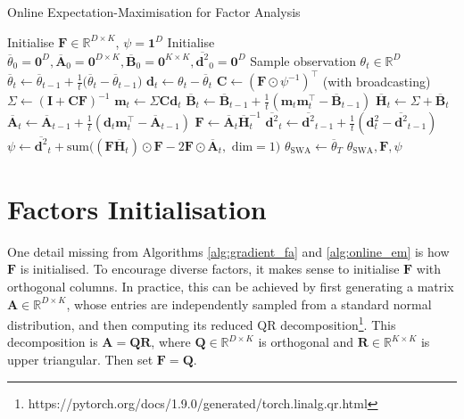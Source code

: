 \documentclass[msc,deptreport.inf]{infthesis} %
\newcommand{\matr}[1]{\mathbf{#1}}
\newcommand{\R}{\mathbb R}
\begin{document}
\begin{algorithm}[!htbp] 
	\caption{Online Expectation-Maximisation for Factor Analysis}
	\label{alg:online_em}
	\begin{algorithmic}[1]
		\State Initialise $\matr{F} \in \R^{D \times K}$, $\psi = \matr{1}^D$
		\State Initialise $\overline{\theta}_0 = \matr{0}^D, \overline{\matr{A}}_0 = \matr{0}^{D \times K}, 
			\overline{\matr{B}}_0 = \matr{0}^{K \times K}, \overline{\matr{d}^2}_0 = \matr{0}^D$
			\State Sample observation $\theta_t \in \R^D$
			\State
				$\overline{\theta}_t \leftarrow  \overline{\theta}_{t-1} + \frac{1}{t}\big(\overline{\theta}_t - \overline{\theta}_{t-1}\big)$
			\State $\matr{d}_t \leftarrow \theta_t - \overline{\theta}_t$
			\State $\matr{C} \leftarrow (\matr{F} \odot \psi^{-1})^\intercal$ (with broadcasting)
			\State $\Sigma \leftarrow (\matr{I} + \matr{C} \matr{F})^{-1}$ 
			\State $\matr{m}_t \leftarrow \Sigma \matr{C} \matr{d}_t$ 
			\State $\overline{\matr{B}}_t \leftarrow \overline{\matr{B}}_{t-1} + \frac{1}{t} (\matr{m}_t \matr{m}_t^\intercal - \overline{\matr{B}}_{t-1})$
			\State $\overline{\matr{H}}_t \leftarrow \Sigma + \overline{\matr{B}}_t$
			\State $\overline{\matr{A}}_t \leftarrow \overline{\matr{A}}_{t-1} + \frac{1}{t} (\matr{d}_t \matr{m}_t^\intercal - \overline{\matr{A}}_{t-1})$
			\State $\matr{F} \leftarrow \overline{\matr{A}}_t \overline{\matr{H}}_t^{-1}$
			\State $\overline{\matr{d}^2}_t \leftarrow \overline{\matr{d}^2}_{t-1} + \frac{1}{t} (\matr{d}_t^2 - \overline{\matr{d}^2}_{t-1})$
			\State $\psi \leftarrow 
				\overline{\matr{d}^2}_t
	+ \text{sum} \big((\matr{F} \overline{\matr{H}}_t) \odot \matr{F} -2\matr{F} \odot \overline{\matr{A}}_t , \text{ dim} = 1\big)$
		\EndFor
		\State $\theta_{\text{SWA}} \leftarrow \overline{\theta}_T$
		\State \Return $\theta_{\text{SWA}}, \matr{F}, \psi$
	\end{algorithmic}
\end{algorithm}

\section{Factors Initialisation}\label{sec:F_init}

One detail missing from Algorithms \ref{alg:gradient_fa} and \ref{alg:online_em} is how $\matr{F}$ is initialised. To encourage diverse factors, it makes sense to initialise $\matr{F}$ with orthogonal columns. In practice, this can be achieved by first generating a matrix $\matr{A}  \in \R^{D \times K}$, whose entries are independently sampled from a standard normal distribution, and then computing its reduced QR decomposition\footnote{https://pytorch.org/docs/1.9.0/generated/torch.linalg.qr.html}. This decomposition is $\matr{A} = \matr{Q}\matr{R}$, where $\matr{Q} \in \R^{D \times K}$ is orthogonal and $\matr{R} \in \R^{K \times K}$ is upper triangular. Then set $\matr{F} = \matr{Q}$.
\end{document}
